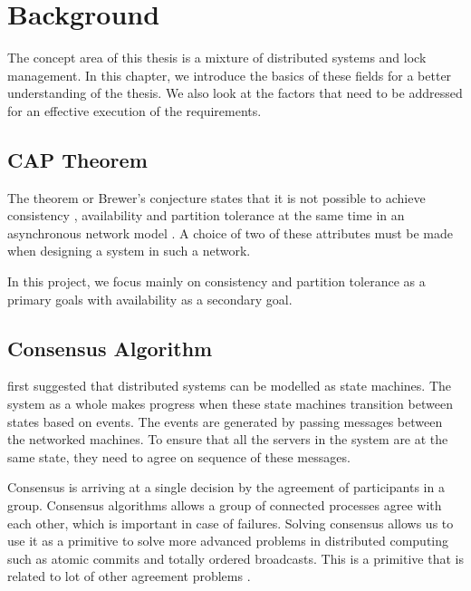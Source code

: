 \chapter{Background}
\label{chapter:background}

The concept area of this thesis is a mixture of distributed systems and lock
management. In this chapter, we introduce the basics of these fields for a
better understanding of the thesis. We also look at the factors that
need to be addressed for an effective execution of the requirements.

\section{CAP Theorem}

The  theorem or Brewer's conjecture states that it is not
possible to achieve consistency%
, availability%
and partition tolerance%
at the same time in an asynchronous network model
\citep{journals/sigact/GilbertL02}. A choice of two of these attributes must
be made when designing a system in such a network.

In this project, we focus mainly on consistency and partition tolerance%
as a primary goals with availability as a secondary goal.

\section{Consensus Algorithm}

\citet{Lamclocks} first suggested that distributed systems can be modelled as
state machines. The system as a whole makes progress when these state machines
transition between states based on events. The events are  generated by passing
messages between the networked machines. To ensure that all the servers in the
system are at the same state, they need to agree on sequence of these messages.

Consensus is arriving at a single decision by the agreement of participants in a
group. Consensus algorithms allows a group of connected processes agree with
each other, which is important in case of failures. Solving consensus allows
us to use it as a primitive to solve more advanced problems in distributed
computing such as atomic commits and totally ordered broadcasts. This is a
primitive that is related to lot of other agreement problems \citep{GS01}.

